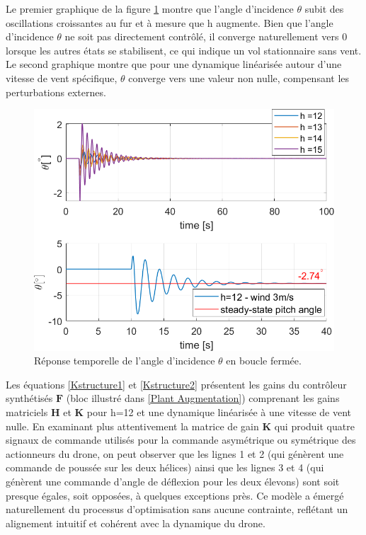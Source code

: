 Le premier graphique de la figure \ref{thetanowind} montre que l'angle d'incidence $\theta$ subit des oscillations croissantes au fur et à mesure que h augmente. Bien que l'angle d'incidence $\theta$ ne soit pas directement contrôlé, il converge naturellement vers 0 lorsque les autres états se stabilisent, ce qui indique un vol stationnaire sans vent. Le second graphique montre que pour une dynamique linéarisée autour d'une vitesse de vent spécifique, $\theta$ converge vers une valeur non nulle, compensant les perturbations externes.

\begin{figure}[hbt]
    \centering
    \includegraphics[width=0.9\columnwidth]{figures/windThetafinalhopeCrop.png}
    \vspace{-0.3cm}\caption{Réponse temporelle de l'angle d'incidence $\theta$ en boucle fermée.}
    \label{thetanowind}
\end{figure}

Les équations \eqref{Kstructure1} et \eqref{Kstructure2} présentent les gains du contrôleur synthétisés $\boldsymbol{F}$ (bloc illustré dans \ref{Plant Augmentation}) comprenant les gains matriciels $\boldsymbol{H}$ et $\boldsymbol{K}$ pour h=12 et une dynamique linéarisée à une vitesse de vent nulle. En examinant plus attentivement la matrice de gain $\boldsymbol{K}$ qui produit quatre signaux de commande utilisés pour la commande asymétrique ou symétrique des actionneurs du drone, on peut observer que les lignes 1 et 2 (qui génèrent une commande de poussée sur les deux hélices) ainsi que les lignes 3 et 4 (qui génèrent une commande d'angle de déflexion pour les deux élevons) sont soit presque égales, soit opposées, à quelques exceptions près. Ce modèle a émergé naturellement du processus d'optimisation sans aucune contrainte, reflétant un alignement intuitif et cohérent avec la dynamique du drone.


